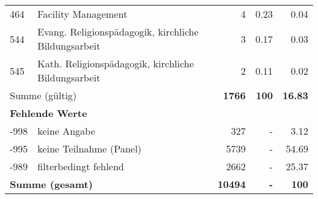 \begin{longtable}{lXrrr}
        464 & \multicolumn{1}{X}{Facility Management} & %
          \num{4} &
          \num[round-mode=places,round-precision=2]{0,23} &
          \num[round-mode=places,round-precision=2]{0,04} \\

        544 & \multicolumn{1}{X}{Evang. Religionspädagogik, kirchliche Bildungsarbeit} & %
          \num{3} &
          \num[round-mode=places,round-precision=2]{0,17} &
          \num[round-mode=places,round-precision=2]{0,03} \\

        545 & \multicolumn{1}{X}{Kath. Religionspädagogik, kirchliche Bildungsarbeit} & %
          \num{2} &
          \num[round-mode=places,round-precision=2]{0,11} &
          \num[round-mode=places,round-precision=2]{0,02} \\

     \midrule
     \multicolumn{2}{l}{Summe (gültig)} &
       \textbf{\num{1766}} &
     \textbf{100} &
       \textbf{\num[round-mode=places,round-precision=2]{16,83}} \\
     \multicolumn{5}{l}{\textbf{Fehlende Werte}}\\
       -998 &
       keine Angabe &
         \num{327} &
        - &
         \num[round-mode=places,round-precision=2]{3,12} \\
       -995 &
       keine Teilnahme (Panel) &
         \num{5739} &
        - &
         \num[round-mode=places,round-precision=2]{54,69} \\
       -989 &
       filterbedingt fehlend &
         \num{2662} &
        - &
         \num[round-mode=places,round-precision=2]{25,37} \\
     \midrule
     \multicolumn{2}{l}{\textbf{Summe (gesamt)}} &
          \textbf{\num{10494}} &
        \textbf{-} &
        \textbf{100} \\
     \bottomrule
     \end{longtable}
     
